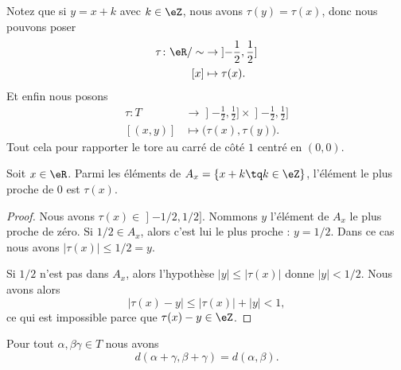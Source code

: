 Notez que si \( y=x+k\) avec \( k\in \eZ\), nous avons \( \tau(y)=\tau(x)\), donc nous pouvons poser
\begin{equation}
	\begin{aligned}
		\tau\colon \eR/\sim & \to \mathopen] -\frac{ 1 }{2},\frac{ 1 }{2}\mathclose] \\
		[x]                 & \mapsto \tau(x).
	\end{aligned}
\end{equation}
Et enfin nous posons
\begin{equation}		\label{EQooCRZHooMNPBDo}
	\begin{aligned}
		\tau\colon T & \to \mathopen] -\frac{ 1 }{2},\frac{ 1 }{2}\mathclose]\times \mathopen] -\frac{ 1 }{2},\frac{ 1 }{2}\mathclose] \\
		[(x,y)]      & \mapsto \big( \tau(x),\tau(y) \big).
	\end{aligned}
\end{equation}
Tout cela pour rapporter le tore au carré de côté \( 1\) centré en \( (0,0)\).

\begin{proposition}	\label{PROPooNRNGooJahxQv}
	Soit \( x\in \eR\). Parmi les éléments de \( A_x=\{ x+k\tq k\in \eZ \}\), l'élément le plus proche de \( 0\) est \( \tau(x)\).
\end{proposition}

\begin{proof}
	Nous avons \( \tau(x)\in\mathopen] -1/2,1/2\mathclose]\). Nommons \( y\) l'élément de \( A_x\) le plus proche de zéro. Si \( 1/2\in A_x\), alors c'est lui le plus proche : \( y=1/2\). Dans ce cas nous avons \( | \tau(x) |\leq 1/2=y\).

	Si \( 1/2\) n'est pas dans \( A_x\), alors l'hypothèse \( | y |\leq | \tau(x) |\) donne \( | y |<1/2\). Nous avons alors
	\begin{equation}
		| \tau(x)-y |\leq | \tau(x) |+| y |<1,
	\end{equation}
	ce qui est impossible parce que \( \tau(x)-y\in \eZ\).
\end{proof}

\begin{lemma}	\label{LEMooQAQPooGGumSe}
	Pour tout \( \alpha,\beta\gamma\in T\) nous avons
	\begin{equation}
		d(\alpha+\gamma,\beta+\gamma)=d(\alpha,\beta).
	\end{equation}
\end{lemma}

